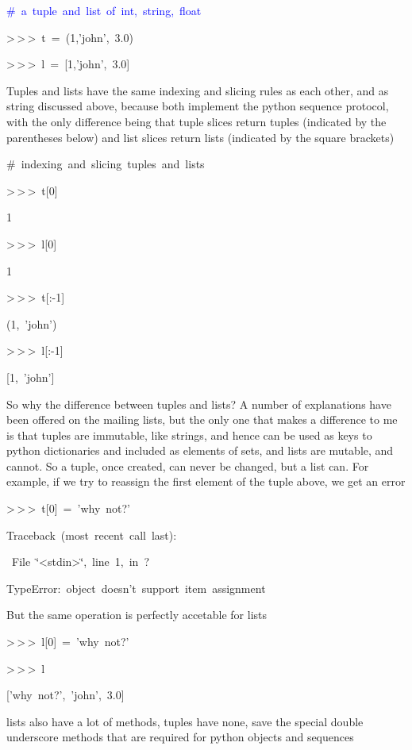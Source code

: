 \begin{lyxcode}
\textcolor{blue}{\#~a~tuple~and~list~of~int,~string,~float}

>\,{}>\,{}>~t~=~(1,'john',~3.0)

>\,{}>\,{}>~l~=~{[}1,'john',~3.0]
\end{lyxcode}
Tuples and lists have the same indexing and slicing rules as each
other, and as string discussed above, because both implement the python
sequence protocol, with the only difference being that tuple slices
return tuples (indicated by the parentheses below) and list slices
return lists (indicated by the square brackets)

\begin{lyxcode}
\#~indexing~and~slicing~tuples~and~lists

>\,{}>\,{}>~t{[}0]

1

>\,{}>\,{}>~l{[}0]

1

>\,{}>\,{}>~t{[}:-1]

(1,~'john')

>\,{}>\,{}>~l{[}:-1]

{[}1,~'john']
\end{lyxcode}
So why the difference between tuples and lists? A number of explanations
have been offered on the mailing lists, but the only one that makes
a difference to me is that tuples are immutable, like strings, and
hence can be used as keys to python dictionaries and included as elements
of sets, and lists are mutable, and cannot. So a tuple, once created,
can never be changed, but a list can. For example, if we try to reassign
the first element of the tuple above, we get an error

\begin{lyxcode}
>\,{}>\,{}>~t{[}0]~=~'why~not?'

Traceback~(most~recent~call~last):

~File~\char`\"{}<stdin>\char`\"{},~line~1,~in~?

TypeError:~object~doesn't~support~item~assignment
\end{lyxcode}
But the same operation is perfectly accetable for lists

\begin{lyxcode}
>\,{}>\,{}>~l{[}0]~=~'why~not?'

>\,{}>\,{}>~l

{[}'why~not?',~'john',~3.0]
\end{lyxcode}
lists also have a lot of methods, tuples have none, save the special
double underscore methods that are required for python objects and
sequences

